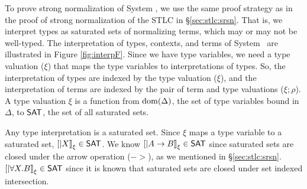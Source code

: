 To prove strong normalization of System \F, we use the same proof strategy
as in the proof of strong normalization of the STLC in \S\ref{sec:stlc:srsn}.
That is, we interpret types as saturated sets of normalizing terms, which
may or may not be well-typed. The interpretation of types, contexts, and
terms of System \F\ are illustrated in Figure \ref{fig:interpF}. Since we
have type variables, we need a type valuation ($\xi$) that maps
the type variables to interpretations of types. So, the interpretation of types
are indexed by the type valuation ($\xi$), and the interpretation of terms are
indexed by the pair of term and type valuations ($\xi;\rho$). A type valuation
$\xi$ is a function from $\mathop{\mathrm{dom}}(\Delta)$, the set of type variables bound in
$\Delta$, to $\mathsf{SAT}$, the set of all saturated sets.

Any type interpretation is a saturated set. Since $\xi$ maps a type variable
to a saturated set, $[|X|]_\xi \in \mathsf{SAT}$. We know $[|A -> B|]_\xi \in \mathsf{SAT}$
since saturated sets are closed under the arrow operation ($->$), as we
mentioned in \S\ref{sec:stlc:srsn}. $[|\forall X.B|]_\xi \in \mathsf{SAT}$ since
it is known that saturated sets are closed under set indexed intersection.

